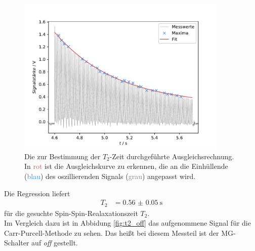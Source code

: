 \begin{figure}[H]
  \centering
  \includegraphics[width=0.9\textwidth]{../Auswertung/T2_fit.pdf}
  \caption{Die zur Bestimmung der $T_2$-Zeit durchgeführte Ausgleichsrechnung. In \textcolor{indianred}{rot} ist die Ausgleichskurve zu erkennen,
  die an die Einhüllende (\textcolor{dodgerblue}{blau}) des oszillierenden Signals (\textcolor{gray}{grau}) angepasst wird.}
  \label{fig:T2_fit}
\end{figure} \noindent
Die Regression liefert
\begin{align*}
  T_2 &=  \SI{0.56(005)}{\second}
\end{align*}
für die gesuchte Spin-Spin-Realaxationszeit $T_2$. \\
Im Vergleich dazu ist in Abbidung \ref{fig:t2_off} das aufgenommene Signal für die Carr-Purcell-Methode zu sehen. Das heißt bei diesem
Messteil ist der MG-Schalter auf \textit{off} gestellt.
